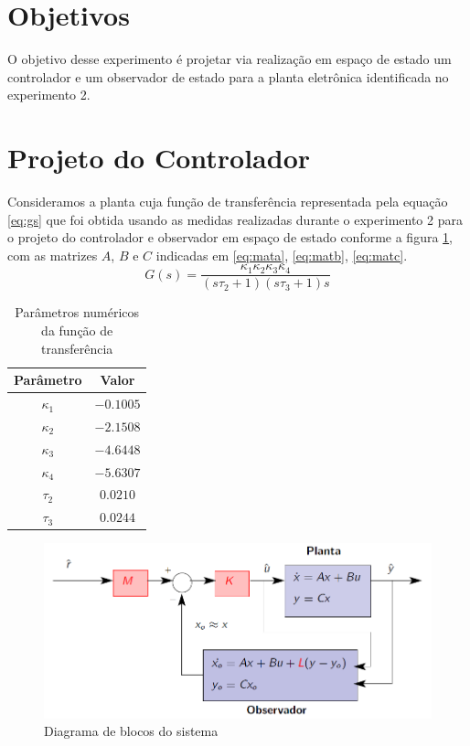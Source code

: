 \documentclass{article}
\begin{document}


\onehalfspacing
\section{Objetivos} 
O objetivo desse experimento é projetar via realização em espaço de estado um controlador e um observador de estado para a planta eletrônica identificada no experimento 2\cite{bb:lab2}. 
	
\section{Projeto do Controlador}
Consideramos a planta cuja função de transferência representada pela equação \ref{eq:gs} que foi obtida usando as medidas realizadas durante o experimento 2\cite{bb:lab2} para o projeto do controlador e observador em espaço de estado conforme a figura \ref{fig:contrss}, com as matrizes $A$, $B$ e $C$ indicadas em \ref{eq:mata}, \ref{eq:matb}, \ref{eq:matc}.\\

\begin{equation}
\label{eq:gs}
G(s) = \frac{\kappa_1\kappa_2\kappa_3\kappa_4}{(s\tau_2 + 1)(s\tau_3 + 1)s}
\end{equation}

\begin{table}[H]
	\centering
	\caption{Parâmetros numéricos da função de transferência}
	\label{tab:valores}
	\begin{tabular}{|c|c|}
		\hline Parâmetro & Valor \\ 
		\hline $\kappa_1$ & $-0.1005$\\ 
		\hline $\kappa_2$ & $-2.1508$\\ 
		\hline $\kappa_3$ & $-4.6448$\\ 
		\hline $\kappa_4$ & $-5.6307$\\ 
		\hline $\tau_2$ & $0.0210$\\ 
		\hline $\tau_3$ & $0.0244$ \\ 	
		\hline 
	\end{tabular} 
\end{table}

\begin{figure}[H]
	\centering
	\includegraphics[width=0.8\linewidth]{contrss}
	\caption{Diagrama de blocos do sistema}
	\label{fig:contrss}
\end{figure}
\end{document}
